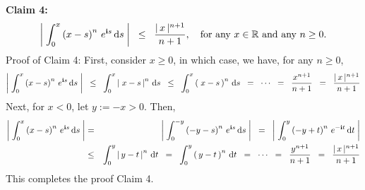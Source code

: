 \vskip 0.5cm
\noindent
\textbf{Claim 4:}
\begin{equation*}
\left\vert\;
\int_{0}^{x}\left(x-s\right)^{n}\,e^{\textnormal{\bf i} s}\,\textnormal{d} s
\;\right\vert
\;\; \leq \;\; \dfrac{\vert\,x\,\vert^{n+1}}{n+1},
\quad
\textnormal{for any $x \in \mathbb{R}$ and any $n \geq 0$.}
\end{equation*}
{\small Proof of Claim 4:
First, consider $x \geq 0$, in which case, we have, for any $n \geq 0$,
\begin{equation*}
\left\vert\;
\int_{0}^{x}\left(x-s\right)^{n}\,e^{\textnormal{\bf i} s}\,\textnormal{d} s
\;\right\vert
\;\;\leq\;\; \int_{0}^{x}\left\vert\; x-s\,\right\vert^{n} \,\textnormal{d} s
\;\;\leq\;\; \int_{0}^{x}\left(\; x-s\,\right)^{n} \,\textnormal{d} s
\;\;=\;\; \cdots \;\;=\;\; \dfrac{x^{n+1}}{n+1} \;\;=\;\; \dfrac{\vert\,x\,\vert^{n+1}}{n+1}
\end{equation*}
Next, for $x < 0$, let $y := -x > 0$. Then,
\begin{eqnarray*}
\left\vert\;
\int_{0}^{x}\left(x-s\right)^{n}\,e^{\textnormal{\bf i} s}\,\textnormal{d} s
\;\right\vert
&=& \left\vert\; \int_{0}^{-y}\left(-y-s\right)^{n}\,e^{\textnormal{\bf i} s}\,\textnormal{d} s \;\right\vert
\;\;=\;\; \left\vert\; \int_{0}^{y}\left(-y+t\right)^{n}\,e^{-\textnormal{\bf i} t}\,\textnormal{d} t \;\right\vert
\\
&\leq& \int_{0}^{y}\left\vert\, y-t \,\right\vert^{n} \,\textnormal{d} t
\;\;=\;\; \int_{0}^{y}\left(\, y-t \,\right)^{n} \,\textnormal{d} t
\;\;=\;\; \cdots \;\;=\;\; \dfrac{y^{n+1}}{n+1} \;\;=\;\; \dfrac{\vert\,x\,\vert^{n+1}}{n+1}
\end{eqnarray*}
This completes the proof Claim 4.
}

